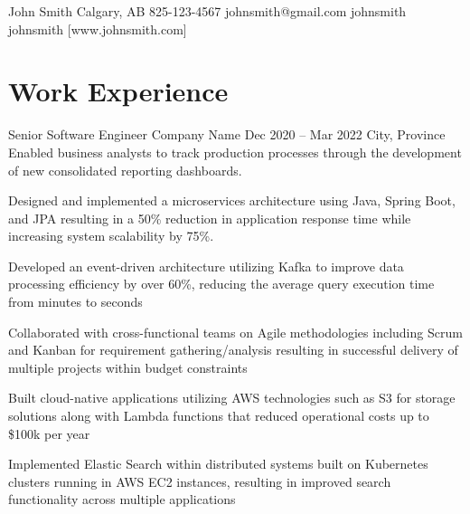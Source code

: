 \documentclass[letterpaper]{resume_config}
\begin{document}
\Header
    {John Smith} %
    {Calgary, AB} %
    {825-123-4567} %
    {johnsmith@gmail.com} %
    {johnsmith} %
    {johnsmith} %
    [www.johnsmith.com] %


\section{Work Experience}

\WorkExperience
    {Senior Software Engineer} %
    {Company Name} %
    {Dec 2020 -- Mar 2022} %
    {City, Province} %
    {Enabled business analysts to track production processes through the development of new consolidated reporting dashboards.} %
    {
        \item Designed and implemented a microservices architecture using Java, Spring Boot, and JPA resulting in a 50\% reduction in application response time while increasing system scalability by 75\%.
        \item Developed an event-driven architecture utilizing Kafka to improve data processing efficiency by over 60\%, reducing the average query execution time from minutes to seconds
        \item Collaborated with cross-functional teams on Agile methodologies including Scrum and Kanban for requirement gathering/analysis resulting in successful delivery of multiple projects within budget constraints
        \item Built cloud-native applications utilizing AWS technologies such as S3 for storage solutions along with Lambda functions that reduced operational costs up to \$100k per year
        \item Implemented Elastic Search within distributed systems built on Kubernetes clusters running in AWS EC2 instances, resulting in improved search functionality across multiple applications
    } 
\end{document}
